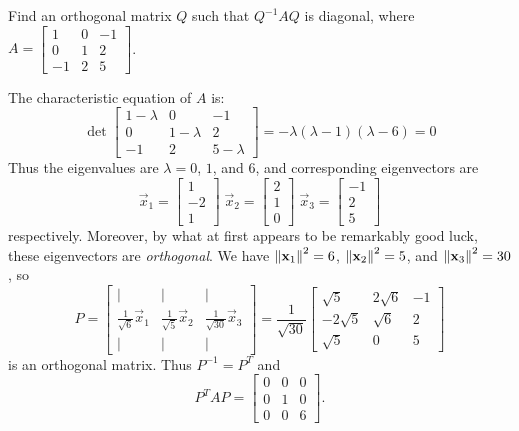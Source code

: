\documentclass{ximera}
\begin{document}
\begin{example}\label{ex:DiagonalizeSymmetricMatrix}
Find an orthogonal matrix $Q$ such that $Q^{-1}AQ$ is diagonal, where $A = \begin{bmatrix}
1 & 0 & -1 \\
0 & 1 & 2 \\
-1 & 2 & 5
\end{bmatrix}$.

\begin{explanation}
 The characteristic equation of $A$ is:
\begin{equation*}
\det \begin{bmatrix}
1-\lambda & 0 & -1 \\
0 & 1-\lambda & 2 \\
-1 & 2 & 5-\lambda
\end{bmatrix} = -\lambda(\lambda - 1)(\lambda - 6)=0
\end{equation*}
Thus the eigenvalues are $\lambda = 0$, $1$, and $6$, and corresponding eigenvectors are
\begin{equation*}
\vec{x}_{1} = \begin{bmatrix}
1 \\
-2 \\
1
\end{bmatrix} \;
\vec{x}_{2} = \begin{bmatrix}
2 \\
1 \\
0
\end{bmatrix} \;
\vec{x}_{3} = \begin{bmatrix}
-1 \\
2 \\
5
\end{bmatrix}
\end{equation*}
respectively. Moreover, by what at first appears to be remarkably good luck, these eigenvectors are \textit{orthogonal}. We have $\left\lVert\mathbf{x}_{1}\right\rVert^{2} = 6$, $\left\lVert\mathbf{x}_{2}\right\rVert^{2} = 5$, and $\left\lVert\mathbf{x}_{3}\right\rVert^{2} = 30$, so
\begin{equation*}
P = \begin{bmatrix}
| & | &  | \\
\frac{1}{\sqrt{6}}\vec{x}_{1} & \frac{1}{\sqrt{5}}\vec{x}_{2} & \frac{1}{\sqrt{30}}\vec{x}_{3} \\
| & | &  | 
\end{bmatrix} = \frac{1}{\sqrt{30}} \begin{bmatrix}
\sqrt{5} & 2\sqrt{6} & -1 \\
-2\sqrt{5} & \sqrt{6} & 2 \\
\sqrt{5} & 0 & 5
\end{bmatrix}
\end{equation*}
is an orthogonal matrix. Thus $P^{-1} = P^{T}$ and
\begin{equation*}
P^TAP = \begin{bmatrix}
0 & 0 & 0 \\
0 & 1 & 0 \\
0 & 0 & 6
\end{bmatrix}.
\end{equation*}

\end{explanation}
\end{example}
\end{document}
